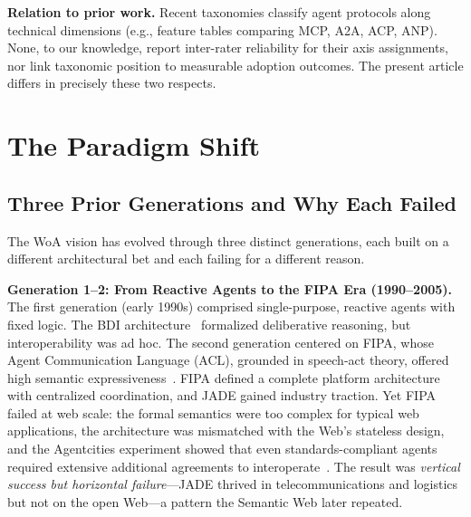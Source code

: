\documentclass{IEEEcsmag}
\begin{document}
\textbf{Relation to prior work.}  Recent taxonomies classify agent protocols along technical dimensions (e.g., feature tables comparing MCP, A2A, ACP, ANP).  None, to our knowledge, report inter-rater reliability for their axis assignments, nor link taxonomic position to measurable adoption outcomes.  The present article differs in precisely these two respects.


\section{The Paradigm Shift}\label{sec:paradigm}

\subsection{Three Prior Generations and Why Each Failed}

The WoA vision has evolved through three distinct generations, each built on a different architectural bet and each failing for a different reason.

\textbf{Generation 1--2: From Reactive Agents to the FIPA Era (1990--2005).}  The first generation (early 1990s) comprised single-purpose, reactive agents with fixed logic. The BDI architecture~\cite{Rao_1995} formalized deliberative reasoning, but interoperability was ad hoc.  The second generation centered on FIPA, whose Agent Communication Language (ACL), grounded in speech-act theory, offered high semantic expressiveness~\cite{FIPA_2002, Poslad_2007}. FIPA defined a complete platform architecture with centralized coordination, and JADE gained industry traction. Yet FIPA failed at web scale: the formal semantics were too complex for typical web applications, the architecture was mismatched with the Web's stateless design, and the Agentcities experiment showed that even standards-compliant agents required extensive additional agreements to interoperate~\cite{Ciortea_2019}. The result was \emph{vertical success but horizontal failure}---JADE thrived in telecommunications and logistics but not on the open Web---a pattern the Semantic Web later repeated.
\end{document}
